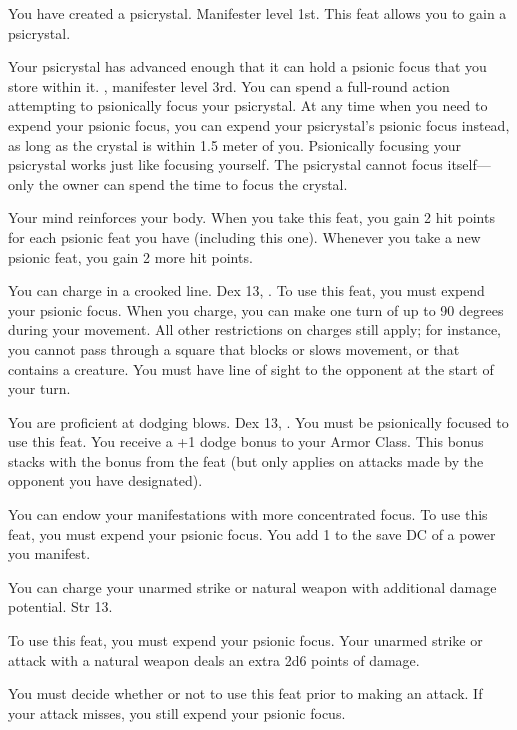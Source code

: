 {You have created a psicrystal.}
{Manifester level 1st.}
{This feat allows you to gain a psicrystal.}
{}{}

{Your psicrystal has advanced enough that it can hold a psionic focus that you store within it.}
{, manifester level 3rd.}
{You can spend a full-round action attempting to psionically focus your psicrystal. At any time when you need to expend your psionic focus, you can expend your psicrystal's psionic focus instead, as long as the crystal is within 1.5 meter of you. Psionically focusing your psicrystal works just like focusing yourself. The psicrystal cannot focus itself---only the owner can spend the time to focus the crystal.}
{}{}

{Your mind reinforces your body.}
{}
{When you take this feat, you gain 2 hit points for each psionic feat you have (including this one). Whenever you take a new psionic feat, you gain 2 more hit points.}
{}{}

{You can charge in a crooked line.}
{Dex 13, .}
{To use this feat, you must expend your psionic focus. When you charge, you can make one turn of up to 90 degrees during your movement. All other restrictions on charges still apply; for instance, you cannot pass through a square that blocks or slows movement, or that contains a creature. You must have line of sight to the opponent at the start of your turn.}
{}{}

{You are proficient at dodging blows.}
{Dex 13, .}
{You must be psionically focused to use this feat. You receive a +1 dodge bonus to your Armor Class. This bonus stacks with the bonus from the  feat (but only applies on attacks made by the opponent you have designated).}
{}{}

{You can endow your manifestations with more concentrated focus.}
{}
{To use this feat, you must expend your psionic focus. You add 1 to the save DC of a power you manifest.}
{}{}

{You can charge your unarmed strike or natural weapon with additional damage potential.}
{Str 13.}
{To use this feat, you must expend your psionic focus. Your unarmed strike or attack with a natural weapon deals an extra 2d6 points of damage.

You must decide whether or not to use this feat prior to making an attack. If your attack misses, you still expend your psionic focus.}
{}{}

